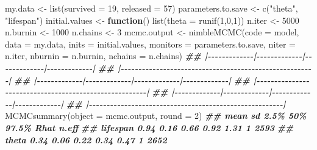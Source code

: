 \documentclass[
  12pt,
]{krantz}
\newenvironment{Shaded}{\begin{snugshade}}{\end{snugshade}}
\newcommand{\AttributeTok}[1]{\textcolor[rgb]{0.77,0.63,0.00}{#1}}
\newcommand{\ControlFlowTok}[1]{\textcolor[rgb]{0.13,0.29,0.53}{\textbf{#1}}}
\newcommand{\DecValTok}[1]{\textcolor[rgb]{0.00,0.00,0.81}{#1}}
\newcommand{\DocumentationTok}[1]{\textcolor[rgb]{0.56,0.35,0.01}{\textbf{\textit{#1}}}}
\newcommand{\FunctionTok}[1]{\textcolor[rgb]{0.00,0.00,0.00}{#1}}
\newcommand{\NormalTok}[1]{#1}
\newcommand{\OtherTok}[1]{\textcolor[rgb]{0.56,0.35,0.01}{#1}}
\newcommand{\StringTok}[1]{\textcolor[rgb]{0.31,0.60,0.02}{#1}}
\begin{document}
\begin{Shaded}
\begin{Highlighting}[]
\NormalTok{my.data }\OtherTok{\textless{}{-}} \FunctionTok{list}\NormalTok{(}\AttributeTok{survived =} \DecValTok{19}\NormalTok{, }\AttributeTok{released =} \DecValTok{57}\NormalTok{)}
\NormalTok{parameters.to.save }\OtherTok{\textless{}{-}} \FunctionTok{c}\NormalTok{(}\StringTok{"theta"}\NormalTok{, }\StringTok{"lifespan"}\NormalTok{)}
\NormalTok{initial.values }\OtherTok{\textless{}{-}} \ControlFlowTok{function}\NormalTok{() }\FunctionTok{list}\NormalTok{(}\AttributeTok{theta =} \FunctionTok{runif}\NormalTok{(}\DecValTok{1}\NormalTok{,}\DecValTok{0}\NormalTok{,}\DecValTok{1}\NormalTok{))}
\NormalTok{n.iter }\OtherTok{\textless{}{-}} \DecValTok{5000}
\NormalTok{n.burnin }\OtherTok{\textless{}{-}} \DecValTok{1000}
\NormalTok{n.chains }\OtherTok{\textless{}{-}} \DecValTok{3}
\NormalTok{mcmc.output }\OtherTok{\textless{}{-}} \FunctionTok{nimbleMCMC}\NormalTok{(}\AttributeTok{code =}\NormalTok{ model,}
                          \AttributeTok{data =}\NormalTok{ my.data,}
                          \AttributeTok{inits =}\NormalTok{ initial.values,}
                          \AttributeTok{monitors =}\NormalTok{ parameters.to.save,}
                          \AttributeTok{niter =}\NormalTok{ n.iter,}
                          \AttributeTok{nburnin =}\NormalTok{ n.burnin,}
                          \AttributeTok{nchains =}\NormalTok{ n.chains)}
\DocumentationTok{\#\# |{-}{-}{-}{-}{-}{-}{-}{-}{-}{-}{-}{-}{-}|{-}{-}{-}{-}{-}{-}{-}{-}{-}{-}{-}{-}{-}|{-}{-}{-}{-}{-}{-}{-}{-}{-}{-}{-}{-}{-}|{-}{-}{-}{-}{-}{-}{-}{-}{-}{-}{-}{-}{-}|}
\DocumentationTok{\#\# |{-}{-}{-}{-}{-}{-}{-}{-}{-}{-}{-}{-}{-}{-}{-}{-}{-}{-}{-}{-}{-}{-}{-}{-}{-}{-}{-}{-}{-}{-}{-}{-}{-}{-}{-}{-}{-}{-}{-}{-}{-}{-}{-}{-}{-}{-}{-}{-}{-}{-}{-}{-}{-}{-}{-}|}
\DocumentationTok{\#\# |{-}{-}{-}{-}{-}{-}{-}{-}{-}{-}{-}{-}{-}|{-}{-}{-}{-}{-}{-}{-}{-}{-}{-}{-}{-}{-}|{-}{-}{-}{-}{-}{-}{-}{-}{-}{-}{-}{-}{-}|{-}{-}{-}{-}{-}{-}{-}{-}{-}{-}{-}{-}{-}|}
\DocumentationTok{\#\# |{-}{-}{-}{-}{-}{-}{-}{-}{-}{-}{-}{-}{-}{-}{-}{-}{-}{-}{-}{-}{-}{-}{-}{-}{-}{-}{-}{-}{-}{-}{-}{-}{-}{-}{-}{-}{-}{-}{-}{-}{-}{-}{-}{-}{-}{-}{-}{-}{-}{-}{-}{-}{-}{-}{-}|}
\DocumentationTok{\#\# |{-}{-}{-}{-}{-}{-}{-}{-}{-}{-}{-}{-}{-}|{-}{-}{-}{-}{-}{-}{-}{-}{-}{-}{-}{-}{-}|{-}{-}{-}{-}{-}{-}{-}{-}{-}{-}{-}{-}{-}|{-}{-}{-}{-}{-}{-}{-}{-}{-}{-}{-}{-}{-}|}
\DocumentationTok{\#\# |{-}{-}{-}{-}{-}{-}{-}{-}{-}{-}{-}{-}{-}{-}{-}{-}{-}{-}{-}{-}{-}{-}{-}{-}{-}{-}{-}{-}{-}{-}{-}{-}{-}{-}{-}{-}{-}{-}{-}{-}{-}{-}{-}{-}{-}{-}{-}{-}{-}{-}{-}{-}{-}{-}{-}|}
\FunctionTok{MCMCsummary}\NormalTok{(}\AttributeTok{object =}\NormalTok{ mcmc.output, }\AttributeTok{round =} \DecValTok{2}\NormalTok{)}
\DocumentationTok{\#\#          mean   sd 2.5\%  50\% 97.5\% Rhat n.eff}
\DocumentationTok{\#\# lifespan 0.94 0.16 0.66 0.92  1.31    1  2593}
\DocumentationTok{\#\# theta    0.34 0.06 0.22 0.34  0.47    1  2652}
\end{Highlighting}
\end{Shaded}
\end{document}
